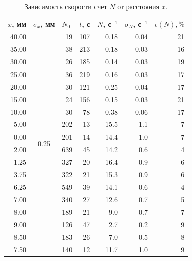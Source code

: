\documentclass{article}
\begin{document}
\begin{table}[h!]
\centering
\begin{tabular}{|r|c|r|r|r|r|r|}
\hline
\multicolumn{1}{|l|}{$x$, мм} &
  \multicolumn{1}{l|}{$\sigma_x$, мм} &
  \multicolumn{1}{l|}{$N_0$} &
  \multicolumn{1}{l|}{$t$, с} &
  \multicolumn{1}{l|}{$N$, с$^{-1}$} &
  \multicolumn{1}{l|}{$\sigma_{N}$, с$^{-1}$} &
  \multicolumn{1}{l|}{$\epsilon(N),   \%$} \\ \hline
40.00 & \multirow{18}{*}{0.25} & 19  & 107 & 0.18 & 0.04 & 21 \\ \cline{1-1} \cline{3-7} 
35.00 &                        & 38  & 213 & 0.18 & 0.03 & 16 \\ \cline{1-1} \cline{3-7} 
30.00 &                        & 26  & 185 & 0.14 & 0.03 & 19 \\ \cline{1-1} \cline{3-7} 
25.00 &                        & 36  & 219 & 0.16 & 0.03 & 17 \\ \cline{1-1} \cline{3-7} 
20.00 &                        & 30  & 121 & 0.25 & 0.04 & 17 \\ \cline{1-1} \cline{3-7} 
15.00 &                        & 24  & 156 & 0.15 & 0.03 & 21 \\ \cline{1-1} \cline{3-7} 
10.00 &                        & 30  & 78  & 0.38 & 0.06 & 17 \\ \cline{1-1} \cline{3-7} 
5.00  &                        & 202 & 13  & 15.5 & 1.1  & 7  \\ \cline{1-1} \cline{3-7} 
0.00  &                        & 201 & 14  & 14.4 & 1.0  & 7  \\ \cline{1-1} \cline{3-7} 
2.00  &                        & 639 & 45  & 14.2 & 0.6  & 4  \\ \cline{1-1} \cline{3-7} 
1.25  &                        & 327 & 20  & 16.4 & 0.9  & 6  \\ \cline{1-1} \cline{3-7} 
3.75  &                        & 322 & 21  & 15.3 & 0.9  & 6  \\ \cline{1-1} \cline{3-7} 
6.25  &                        & 549 & 39  & 14.1 & 0.6  & 4  \\ \cline{1-1} \cline{3-7} 
7.00  &                        & 340 & 27  & 12.6 & 0.7  & 5  \\ \cline{1-1} \cline{3-7} 
8.00  &                        & 189 & 21  & 9.0    & 0.7  & 7  \\ \cline{1-1} \cline{3-7} 
9.00  &                        & 126 & 47  & 2.7  & 0.2  & 9  \\ \cline{1-1} \cline{3-7} 
8.50  &                        & 183 & 26  & 7.0    & 0.5  & 8  \\ \cline{1-1} \cline{3-7} 
7.50  &                        & 140 & 12  & 11.7 & 1.0  & 9  \\ \hline
\end{tabular}
\caption{Зависимость скорости счет $N$ от расстояния $x$.}
\label{tab:my-table}
\end{table}
 
\end{document}
